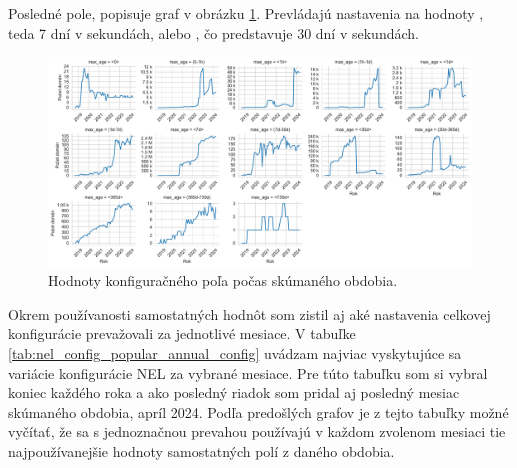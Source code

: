 Posledné pole,  popisuje graf v obrázku \ref{fig:httparchive-nel-config-ma-dist}.
Prevládajú nastavenia na hodnoty , teda 7 dní v sekundách, alebo , čo predstavuje 30 dní v sekundách.

\begin{figure}[!htb]
\begin{center}
 \includegraphics[scale=0.447]{obrazky-figures/httparchive_nel_config_ma_dist.pdf}
 \caption{Hodnoty konfiguračného poľa  počas skúmaného obdobia.}
 \label{fig:httparchive-nel-config-ma-dist}
\end{center}
\end{figure}

Okrem používanosti samostatných hodnôt som zistil aj aké nastavenia celkovej konfigurácie prevažovali za jednotlivé mesiace.
V tabuľke \ref{tab:nel_config_popular_annual_config} uvádzam najviac vyskytujúce sa variácie konfigurácie NEL za vybrané mesiace.
Pre túto tabuľku som si vybral koniec každého roka a ako posledný riadok som pridal aj posledný mesiac skúmaného obdobia, apríl 2024.
Podľa predošlých grafov je z tejto tabuľky možné vyčítať, že sa s jednoznačnou prevahou používajú v každom zvolenom mesiaci tie najpoužívanejšie hodnoty samostatných polí z daného obdobia.

\begin{table}[!htb]
\centering
{}
\label{tab:nel_config_popular_annual_config}
\caption{Najpoužívanejšie konfigurácie NEL za vybrané mesiace.}
\end{table}


